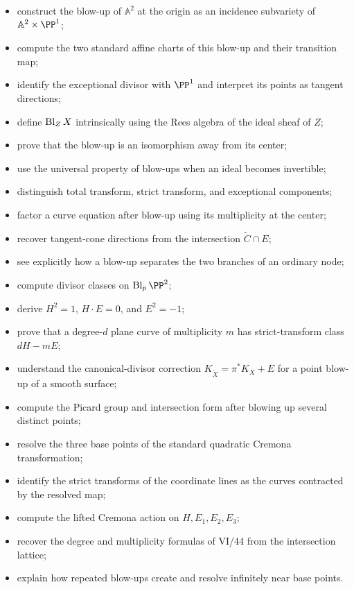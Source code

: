 \begin{itemize}
\item construct the blow-up of \(\mathbb A^2\) at the origin as an incidence subvariety of \(\mathbb A^2\times\PP^1\);
\item compute the two standard affine charts of this blow-up and their transition map;
\item identify the exceptional divisor with \(\PP^1\) and interpret its points as tangent directions;
\item define \(\operatorname{Bl}_ZX\) intrinsically using the Rees algebra of the ideal sheaf of \(Z\);
\item prove that the blow-up is an isomorphism away from its center;
\item use the universal property of blow-ups when an ideal becomes invertible;
\item distinguish total transform, strict transform, and exceptional components;
\item factor a curve equation after blow-up using its multiplicity at the center;
\item recover tangent-cone directions from the intersection \(\widetilde C\cap E\);
\item see explicitly how a blow-up separates the two branches of an ordinary node;
\item compute divisor classes on \(\Bl_p\PP^2\);
\item derive \(H^2=1\), \(H\cdot E=0\), and \(E^2=-1\);
\item prove that a degree-\(d\) plane curve of multiplicity \(m\) has strict-transform class \(dH-mE\);
\item understand the canonical-divisor correction \(K_{\widetilde X}=\pi^*K_X+E\) for a point blow-up of a smooth surface;
\item compute the Picard group and intersection form after blowing up several distinct points;
\item resolve the three base points of the standard quadratic Cremona transformation;
\item identify the strict transforms of the coordinate lines as the curves contracted by the resolved map;
\item compute the lifted Cremona action on \(H,E_1,E_2,E_3\);
\item recover the degree and multiplicity formulas of VI/44 from the intersection lattice;
\item explain how repeated blow-ups create and resolve infinitely near base points.
\end{itemize}

